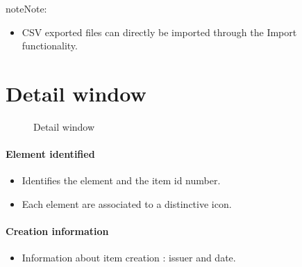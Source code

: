 \documentclass[letterpaper,10pt,english]{sphinxmanual}
\begin{document}
\begin{notice}{note}{Note:}\begin{itemize}
\item {} 
CSV exported files can directly be imported through the Import functionality.

\end{itemize}
\end{notice}
\newpage

\section{Detail window}
\label{Gui:detail-window}\begin{figure}[htbp]
\centering
\capstart

\caption{Detail window}\end{figure}
\begin{figure}[htbp]
\centering

\end{figure}
\paragraph{Element identified}
\begin{itemize}
\item {} 
Identifies the element and the item id number.

\item {} 
Each element are associated to a distinctive icon.

\end{itemize}
\paragraph{Creation information}
\begin{itemize}
\item {} 
Information about item creation : issuer and date.

\end{itemize}
\end{document}
